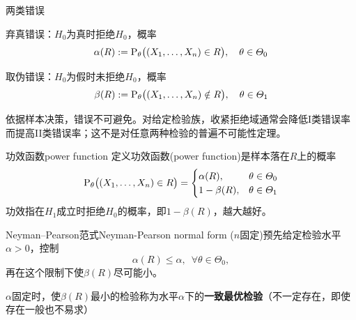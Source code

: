 \begin{definition}{两类错误}{}
	\begin{compactenum}[I]
		\item 弃真错误：$H_0$为真时拒绝$H_0$，概率 
		\begin{equation}
			\alpha(R) := \operatorname{P}_\theta\bigl((X_1,\ldots,X_n) \in R\bigr),\quad \theta \in \varTheta_0
		\end{equation}
		\item 取伪错误：$H_0$为假时未拒绝$H_0$，概率
		\begin{equation}
			\beta(R) := \operatorname{P}_\theta\bigl((X_1,\ldots,X_n) \notin R\bigr),\quad \theta \in \varTheta_1
		\end{equation}
	\end{compactenum}
\end{definition}
依据样本决策，错误不可避免。对给定检验族，收紧拒绝域通常会降低I类错误率而提高II类错误率；这不是对任意两种检验的普遍不可能性定理。
\begin{notecaptionblock}
\end{notecaptionblock}
\begin{definition}{功效函数}{power function}
	定义功效函数(power function)是样本落在$R$上的概率
	\begin{equation}
		\operatorname{P}_\theta\bigl((X_1,\ldots,X_n) \in R\bigr) = \begin{cases}
			\alpha(R),&\theta \in \varTheta_0\\
			1 - \beta(R),&\theta \in \varTheta_1
		\end{cases}
	\end{equation}
	功效指在$H_1$成立时拒绝$H_0$的概率，即$1 - \beta(R)$，越大越好。
\end{definition}
\begin{theorem}{Neyman--Pearson范式}{Neyman-Pearson normal form}
	($n$固定)预先给定检验水平$\alpha > 0$，控制
	\begin{equation}\label{eq:ps-test-level}
		\alpha(R) \leqslant \alpha,\enspace\forall\theta \in \varTheta_0,
	\end{equation}
	再在这个限制下使$\beta(R)$尽可能小。
\end{theorem}
$\alpha$固定时，使$\beta(R)$最小的检验称为水平$\alpha$下的\textbf{一致最优检验}（不一定存在，即使存在一般也不易求）



